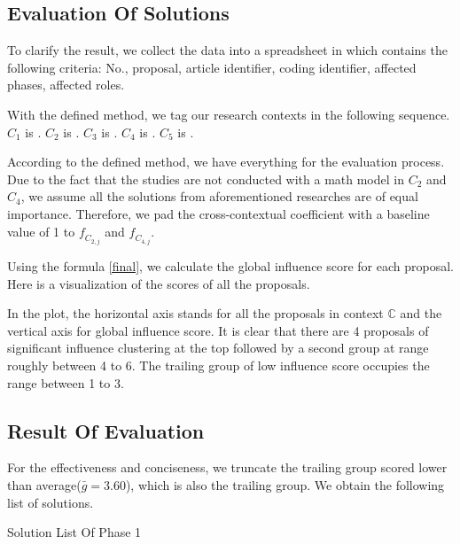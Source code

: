\subsection{Evaluation Of Solutions}
\label{section:evaluation}
To clarify the result, we collect the data into a spreadsheet in which contains the following criteria: No., proposal, article identifier, coding identifier, affected phases, affected roles.

With the defined method, we tag our research contexts in the following sequence.
$C_{1}$ is .
$C_{2}$ is .
$C_{3}$ is .
$C_{4}$ is .
$C_{5}$ is .

According to the defined method, we have everything for the evaluation process. Due to the fact that the studies are not conducted with a math model in $C_{2}$ and $C_{4}$, we assume all the solutions from aforementioned researches are of equal importance. Therefore, we pad the cross-contextual coefficient with a baseline value of 1 to $\mathit{f_{C_{2,j}}}$ and $\mathit{f_{C_{4,j}}}$.

Using the formula \ref{final}, we calculate the global influence score for each proposal. Here is a visualization of the scores of all the proposals.

\begin{figure}[ht]
\centering
{}
\end{figure}

In the plot, the horizontal axis stands for all the proposals in context $\mathbb{C}$ and the vertical axis for global influence score. It is clear that there are 4 proposals of significant influence clustering at the top followed by a second group at range roughly between 4 to 6. The trailing group of low influence score occupies the range between 1 to 3.

\subsection{Result Of Evaluation}
For the effectiveness and conciseness, we truncate the trailing group scored lower than average($\bar{g}=3.60$), which is also the trailing group. We obtain the following list of solutions.

\begin{table}[ht]
\caption{Solution List Of Phase 1}
\label{tab:solution}
\end{table}

